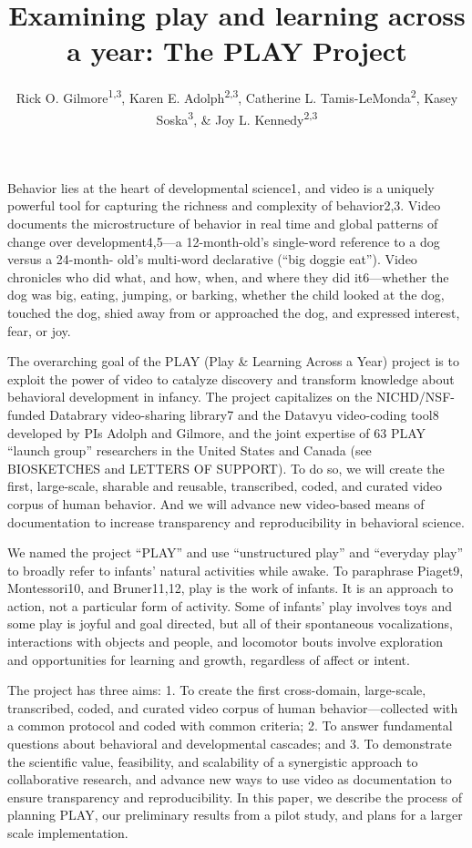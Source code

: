 \documentclass[english,man]{apa6}
\title{Examining play and learning across a year: The PLAY Project}
\author{Rick O. Gilmore\textsuperscript{1,3}, Karen E. Adolph\textsuperscript{2,3}, Catherine L. Tamis-LeMonda\textsuperscript{2}, Kasey Soska\textsuperscript{3}, \& Joy L. Kennedy\textsuperscript{2,3}}
\affiliation{
    \vspace{0.5cm}
          \textsuperscript{1} The Pennsylvania State University\\
          \textsuperscript{2} New York University\\
          \textsuperscript{3} Databrary.org  }
\theoremstyle{definition}
\theoremstyle{definition}
\theoremstyle{definition}
\theoremstyle{remark}
\begin{document}
\maketitle

\setcounter{secnumdepth}{0}



Behavior lies at the heart of developmental science1, and video is a
uniquely powerful tool for capturing the richness and complexity of
behavior2,3. Video documents the microstructure of behavior in real time
and global patterns of change over development4,5---a 12-month-old's
single-word reference to a dog versus a 24-month- old's multi-word
declarative (\enquote{big doggie eat}). Video chronicles who did what,
and how, when, and where they did it6---whether the dog was big, eating,
jumping, or barking, whether the child looked at the dog, touched the
dog, shied away from or approached the dog, and expressed interest,
fear, or joy.

The overarching goal of the PLAY (Play \& Learning Across a Year)
project is to exploit the power of video to catalyze discovery and
transform knowledge about behavioral development in infancy. The project
capitalizes on the NICHD/NSF-funded Databrary video-sharing library7 and
the Datavyu video-coding tool8 developed by PIs Adolph and Gilmore, and
the joint expertise of 63 PLAY \enquote{launch group} researchers in the
United States and Canada (see BIOSKETCHES and LETTERS OF SUPPORT). To do
so, we will create the first, large-scale, sharable and reusable,
transcribed, coded, and curated video corpus of human behavior. And we
will advance new video-based means of documentation to increase
transparency and reproducibility in behavioral science.

We named the project \enquote{PLAY} and use \enquote{unstructured play}
and \enquote{everyday play} to broadly refer to infants' natural
activities while awake. To paraphrase Piaget9, Montessori10, and
Bruner11,12, play is the work of infants. It is an approach to action,
not a particular form of activity. Some of infants' play involves toys
and some play is joyful and goal directed, but all of their spontaneous
vocalizations, interactions with objects and people, and locomotor bouts
involve exploration and opportunities for learning and growth,
regardless of affect or intent.

The project has three aims: 1. To create the first cross-domain,
large-scale, transcribed, coded, and curated video corpus of human
behavior---collected with a common protocol and coded with common
criteria; 2. To answer fundamental questions about behavioral and
developmental cascades; and 3. To demonstrate the scientific value,
feasibility, and scalability of a synergistic approach to collaborative
research, and advance new ways to use video as documentation to ensure
transparency and reproducibility. In this paper, we describe the process
of planning PLAY, our preliminary results from a pilot study, and plans
for a larger scale implementation.
\end{document}
